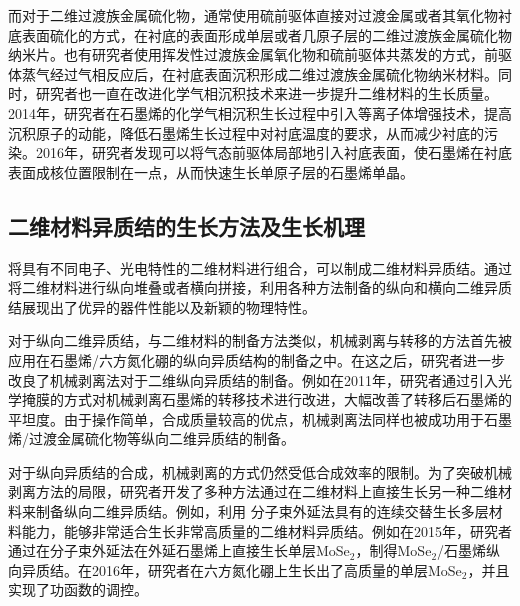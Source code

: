     而对于二维过渡族金属硫化物，通常使用硫前驱体直接对过渡金属或者其氧化物衬底表面硫化的方式，在衬底的表面形成单层或者几原子层的二维过渡族金属硫化物纳米片。也有研究者使用挥发性过渡族金属氧化物和硫前驱体共蒸发的方式，前驱体蒸气经过气相反应后，在衬底表面沉积形成二维过渡族金属硫化物纳米材料。同时，研究者也一直在改进化学气相沉积技术来进一步提升二维材料的生长质量。2014年，研究者在石墨烯的化学气相沉积生长过程中引入等离子体增强技术，提高沉积原子的动能，降低石墨烯生长过程中对衬底温度的要求，从而减少衬底的污染。2016年，研究者发现可以将气态前驱体局部地引入衬底表面，使石墨烯在衬底表面成核位置限制在一点，从而快速生长单原子层的石墨烯单晶。

\subsection{二维材料异质结的生长方法及生长机理}
    将具有不同电子、光电特性的二维材料进行组合，可以制成二维材料异质结。通过将二维材料进行纵向堆叠或者横向拼接，利用各种方法制备的纵向和横向二维异质结展现出了优异的器件性能以及新颖的物理特性。

    对于纵向二维异质结，与二维材料的制备方法类似，机械剥离与转移的方法首先被应用在石墨烯/六方氮化硼的纵向异质结构的制备之中。在这之后，研究者进一步改良了机械剥离法对于二维纵向异质结的制备。例如在2011年，研究者通过引入光学掩膜的方式对机械剥离石墨烯的转移技术进行改进，大幅改善了转移后石墨烯的平坦度。由于操作简单，合成质量较高的优点，机械剥离法同样也被成功用于石墨烯/过渡金属硫化物等纵向二维异质结的制备。

    对于纵向异质结的合成，机械剥离的方式仍然受低合成效率的限制。为了突破机械剥离方法的局限，研究者开发了多种方法通过在二维材料上直接生长另一种二维材料来制备纵向二维异质结。例如，利用
    分子束外延法具有的连续交替生长多层材料能力，能够非常适合生长非常高质量的二维材料异质结。例如在2015年，研究者通过在分子束外延法在外延石墨烯上直接生长单层MoSe$_2$，制得MoSe$_2$/石墨烯纵向异质结。在2016年，研究者在六方氮化硼上生长出了高质量的单层MoSe$_2$，并且实现了功函数的调控。

